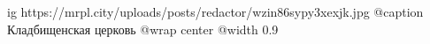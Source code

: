  
 
 
 
 

\ifcmt
  ig https://mrpl.city/uploads/posts/redactor/wzin86sypy3xexjk.jpg
	@caption Кладбищенская церковь
  @wrap center
  @width 0.9
\fi
